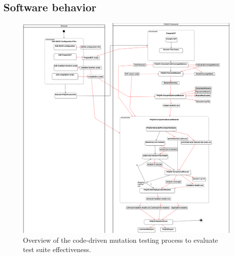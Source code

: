 \clearpage


\subsection{Software behavior}



\begin{figure}[h]
  \centering
	\includegraphics[width=\textwidth]{images/CodeDrivenTestSuiteEvaluation.png}
      \caption{Overview of the code-driven mutation testing process to evaluate test suite effectiveness.}
      \label{fig:process:codeDriven:evaluation}
\end{figure}


